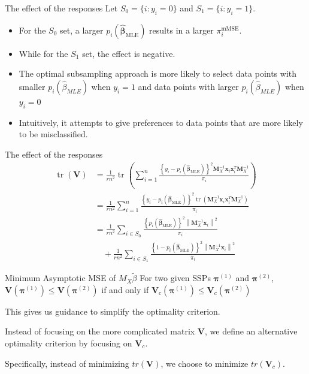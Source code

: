 \documentclass[12pt]{beamer}
\begin{document}
\begin{frame}{The effect of the responses}
Let $S_0=\{i: y_i=0\}$ and $S_1=\{ i:y_i=1\}$.
\begin{itemize}
\item For the $S_0$ set, a larger $p_{i}(\hat{\boldsymbol{\beta}}_{\mathrm{MLE}})$  results in a larger $\pi_{i}^{\mathrm{mMSE}}$.
\item While for the $S_1$ set, the effect is negative.
\item The optimal
subsampling approach is more likely to select data points with
smaller $p_{i}(\hat{\beta}_{MLE})$ when $y_i=1$ and data points with larger $p_{i}(\hat{\beta}_{MLE})$ when $y_i=0$
\item Intuitively, it attempts to give preferences
to data points that are more likely to be misclassified.
\end{itemize} 
\end{frame}

\begin{frame}{The effect of the responses}
$$
\begin{aligned}
\operatorname{tr}(\mathbf{V}) &=\frac{1}{r n^{2}} \operatorname{tr}\left(\sum_{i=1}^{n} \frac{\left\{y_{i}-p_{i}\left(\hat{\boldsymbol{\beta}}_{\mathrm{MLE}}\right)\right\}^{2} \mathbf{M}_{X}^{-1} \mathbf{x}_{i} \mathbf{x}_{i}^{T} \mathbf{M}_{X}^{-1}}{\pi_{i}}\right) \\
&=\frac{1}{r n^{2}} \sum_{i=1}^{n} \frac{\left\{y_{i}-p_{i}\left(\hat{\boldsymbol{\beta}}_{\mathrm{MLE}}\right)\right\}^{2} \operatorname{tr}\left(\mathbf{M}_{X}^{-1} \mathbf{x}_{i} \mathbf{x}_{i}^{T} \mathbf{M}_{X}^{-1}\right)}{\pi_{i}} \\
&= \frac{1}{r n^{2}} \sum_{i \in S_{0}} \frac{\left\{p_{i}\left(\hat{\boldsymbol{\beta}}_{\mathrm{MLE}}\right)\right\}^{2}\left\|\mathbf{M}_{X}^{-1} \mathbf{x}_{i}\right\|^{2}}{\pi_{i}}\\
&\quad +\frac{1}{r n^{2}} \sum_{i \in S_{1}} \frac{\left\{1-p_{i}\left(\hat{\boldsymbol{\beta}}_{\mathrm{MLE}}\right)\right\}^{2}\left\|\mathbf{M}_{X}^{-1} \mathbf{x}_{i}\right\|^{2}}{\pi_{i}}
\end{aligned}
$$
\end{frame}

\begin{frame}{Minimum Asymptotic MSE of $M_X\tilde{\beta}$}
For two given SSPs $\boldsymbol{\pi}^{(1)}$ and $\boldsymbol{\pi}^{(2)}$, $\mathbf{V}\left(\boldsymbol{\pi}^{(1)}\right) \leq \mathbf{V}\left(\boldsymbol{\pi}^{(2)}\right)$ if and only if 
$\mathbf{V}_c\left(\boldsymbol{\pi}^{(1)}\right) \leq \mathbf{V}_c\left(\boldsymbol{\pi}^{(2)}\right)$

This gives us guidance to simplify the optimality criterion.

Instead of focusing on the more complicated
matrix $\mathbf{V}$, we define an alternative optimality criterion by
focusing on $\mathbf{V}_c$. 

Specifically, instead of minimizing $tr(\mathbf{V})$, we choose to minimize $tr(\mathbf{V}_c)$.
\end{frame}
\end{document}
